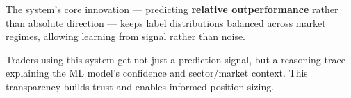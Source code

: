 \documentclass[11pt,a4paper]{article}
\begin{document}
The system's core innovation — predicting \textbf{relative outperformance} rather than absolute direction — keeps label distributions balanced across market regimes, allowing learning from signal rather than noise.

Traders using this system get not just a prediction signal, but a reasoning trace explaining the ML model's confidence and sector/market context. This transparency builds trust and enables informed position sizing.
\end{document}

